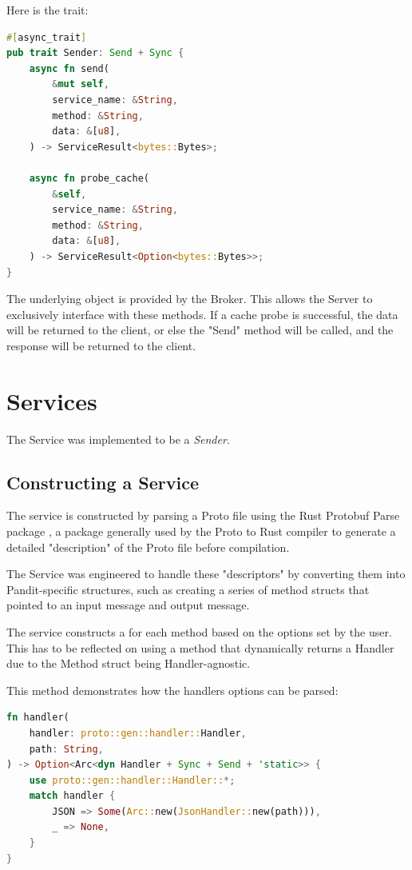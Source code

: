 \documentclass[a4paper,12pt]{report}
\begin{document}
Here is the trait:

\begin{lstlisting}[language=Rust]
#[async_trait]
pub trait Sender: Send + Sync {
    async fn send(
        &mut self,
        service_name: &String,
        method: &String,
        data: &[u8],
    ) -> ServiceResult<bytes::Bytes>;

    async fn probe_cache(
        &self,
        service_name: &String,
        method: &String,
        data: &[u8],
    ) -> ServiceResult<Option<bytes::Bytes>>;
}
\end{lstlisting}

The underlying object is provided by the Broker. This allows the Server to exclusively interface with these methods.
If a cache probe is successful, the data will be returned to the client, or else the "Send" method will be called, and the response will be returned to the client.

\section{Services}

The Service was implemented to be a \textit{Sender}.

\subsection{Constructing a Service}

The service is constructed by parsing a Proto file using the Rust Protobuf Parse package \cite{parse}, a package generally used by the Proto to Rust compiler to generate a detailed "description" of the Proto file before compilation.

The Service was engineered to handle these "descriptors" by converting them into Pandit-specific structures, such as creating a series of method structs that pointed to an input message and output message.

The service constructs a  for each method based on the options set by the user. This has to be reflected on using a method that dynamically returns a Handler due to the Method struct being Handler-agnostic.

This method demonstrates how the handlers options can be parsed:

\begin{lstlisting}[language=Rust]
fn handler(
    handler: proto::gen::handler::Handler,
    path: String,
) -> Option<Arc<dyn Handler + Sync + Send + 'static>> {
    use proto::gen::handler::Handler::*;
    match handler {
        JSON => Some(Arc::new(JsonHandler::new(path))),
        _ => None,
    }
}
\end{lstlisting}
\end{document}
